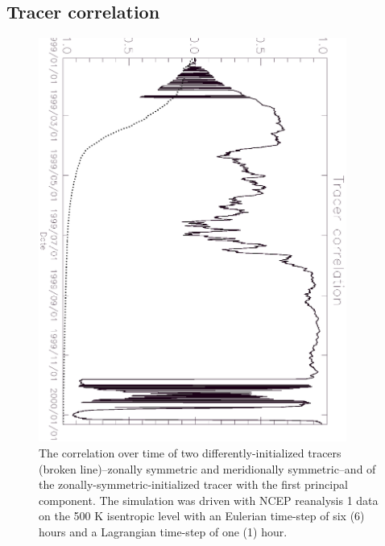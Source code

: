 \documentclass{article}
\begin{document}
\subsection{Tracer correlation}

\begin{figure}
\begin{center}
\includegraphics[angle=90,width=0.9\textwidth]{../pc_proxy/tcorr.eps}
\caption{The correlation over time of two differently-initialized tracers
(broken line)--zonally symmetric and meridionally symmetric--and of
the zonally-symmetric-initialized tracer with the first principal component.
The simulation was driven with NCEP reanalysis 1 data on the 500 K isentropic
level with an Eulerian time-step of six (6) hours and a Lagrangian time-step
of one (1) hour.}\label{tcorr}
\end{center}
\end{figure}
\end{document}

